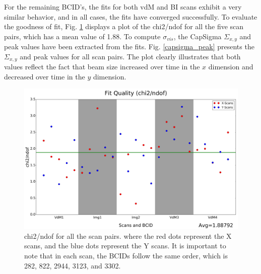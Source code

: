 \newpage
For the remaining BCID's, the fits for both vdM and BI scans exhibit a very similar behavior, and in all cases, the fits have converged successfully. To evaluate the goodness of fit, Fig. \ref{chi2/ndof} displays a plot of the chi2/ndof for all the five scan pairs, which has a mean value of 1.88.
To compute $\sigma_{vis}$, the CapSigma $\Sigma_{x,y}$ and peak values have been extracted from the fits. Fig. \ref{capsigma_peak} presents the $\Sigma_{x,y}$ and peak values for all scan pairs. The plot clearly illustrates that both values reflect the fact that beam size increased over time in the $x$ dimension and decreased over time in the $y$ dimension.

\begin{center}
  \begin{figure}[h!]
    \centering
    \includegraphics[scale=.03]{Chapter4/DGConst_chi2.png}
    \caption[chi2/ndof for all scan pairs]{ chi2/ndof for all the scan pairs.  where the red dots represent the X scans, and the blue dots represent the Y scans. It is important to note that in each scan, the BCIDs follow the same order, which is 282, 822, 2944, 3123, and 3302.} 
    \label{chi2/ndof}
  \end{figure}
\end{center}

